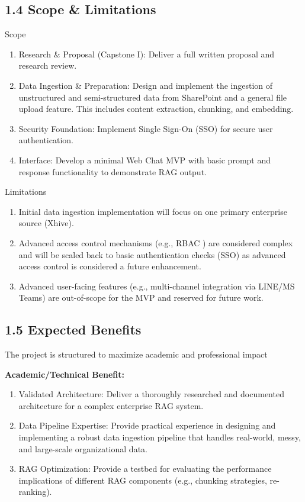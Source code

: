 \documentclass[12pt]{article}
\begin{document}
\subsection{1.4 Scope \& Limitations}\label{scope-limitations}

Scope

\begin{enumerate}
\def\labelenumi{\arabic{enumi}.}
\item
  Research \& Proposal (Capstone I): Deliver a full written proposal and
  research review.
\item
  Data Ingestion \& Preparation: Design and implement the ingestion of
  unstructured and semi-structured data from SharePoint and a general
  file upload feature. This includes content extraction, chunking, and
  embedding.
\item
  Security Foundation: Implement Single Sign-On (SSO) for secure user
  authentication.
\item
  Interface: Develop a minimal Web Chat MVP with basic prompt and
  response functionality to demonstrate RAG output.
\end{enumerate}

Limitations

\begin{enumerate}
\def\labelenumi{\arabic{enumi}.}
\item
  Initial data ingestion implementation will focus on one primary
  enterprise source (Xhive).
\item
  Advanced access control mechanisms (e.g., RBAC ) are considered
  complex and will be scaled back to basic authentication checks (SSO)
  as advanced access control is considered a future enhancement.
\item
  Advanced user-facing features (e.g., multi-channel integration via
  LINE/MS Teams) are out-of-scope for the MVP and reserved for future
  work.
\end{enumerate}

\subsection{1.5 Expected Benefits}\label{expected-benefits}

The project is structured to maximize academic and professional impact

\textbf{Academic/Technical Benefit:}

\begin{enumerate}
\def\labelenumi{\arabic{enumi}.}
\item
  Validated Architecture: Deliver a thoroughly researched and documented
  architecture for a complex enterprise RAG system.
\item
  Data Pipeline Expertise: Provide practical experience in designing and
  implementing a robust data ingestion pipeline that handles real-world,
  messy, and large-scale organizational data.
\item
  RAG Optimization: Provide a testbed for evaluating the performance
  implications of different RAG components (e.g., chunking strategies,
  re-ranking).
\end{enumerate}
\end{document}

